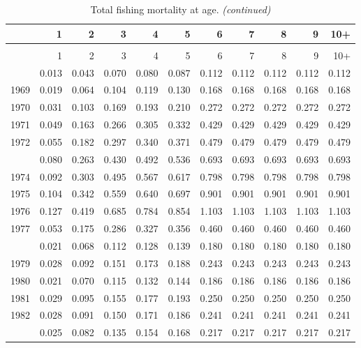 \documentclass[
]{article}
\begin{document}
\begin{longtable}[t]{lrrrrrrrrrr}
\caption{\label{tab:FAA-tot-table}Total fishing mortality at age.}\\
\toprule
  & 1 & 2 & 3 & 4 & 5 & 6 & 7 & 8 & 9 & 10+\\
\midrule
\endfirsthead
\caption[]{Total fishing mortality at age. \textit{(continued)}}\\
\toprule
  & 1 & 2 & 3 & 4 & 5 & 6 & 7 & 8 & 9 & 10+\\
\midrule
\endhead

\endfoot
\bottomrule
\endlastfoot
1968 & 0.013 & 0.043 & 0.070 & 0.080 & 0.087 & 0.112 & 0.112 & 0.112 & 0.112 & 0.112\\
1969 & 0.019 & 0.064 & 0.104 & 0.119 & 0.130 & 0.168 & 0.168 & 0.168 & 0.168 & 0.168\\
1970 & 0.031 & 0.103 & 0.169 & 0.193 & 0.210 & 0.272 & 0.272 & 0.272 & 0.272 & 0.272\\
1971 & 0.049 & 0.163 & 0.266 & 0.305 & 0.332 & 0.429 & 0.429 & 0.429 & 0.429 & 0.429\\
1972 & 0.055 & 0.182 & 0.297 & 0.340 & 0.371 & 0.479 & 0.479 & 0.479 & 0.479 & 0.479\\
\addlinespace
1973 & 0.080 & 0.263 & 0.430 & 0.492 & 0.536 & 0.693 & 0.693 & 0.693 & 0.693 & 0.693\\
1974 & 0.092 & 0.303 & 0.495 & 0.567 & 0.617 & 0.798 & 0.798 & 0.798 & 0.798 & 0.798\\
1975 & 0.104 & 0.342 & 0.559 & 0.640 & 0.697 & 0.901 & 0.901 & 0.901 & 0.901 & 0.901\\
1976 & 0.127 & 0.419 & 0.685 & 0.784 & 0.854 & 1.103 & 1.103 & 1.103 & 1.103 & 1.103\\
1977 & 0.053 & 0.175 & 0.286 & 0.327 & 0.356 & 0.460 & 0.460 & 0.460 & 0.460 & 0.460\\
\addlinespace
1978 & 0.021 & 0.068 & 0.112 & 0.128 & 0.139 & 0.180 & 0.180 & 0.180 & 0.180 & 0.180\\
1979 & 0.028 & 0.092 & 0.151 & 0.173 & 0.188 & 0.243 & 0.243 & 0.243 & 0.243 & 0.243\\
1980 & 0.021 & 0.070 & 0.115 & 0.132 & 0.144 & 0.186 & 0.186 & 0.186 & 0.186 & 0.186\\
1981 & 0.029 & 0.095 & 0.155 & 0.177 & 0.193 & 0.250 & 0.250 & 0.250 & 0.250 & 0.250\\
1982 & 0.028 & 0.091 & 0.150 & 0.171 & 0.186 & 0.241 & 0.241 & 0.241 & 0.241 & 0.241\\
\addlinespace
1983 & 0.025 & 0.082 & 0.135 & 0.154 & 0.168 & 0.217 & 0.217 & 0.217 & 0.217 & 0.217\\

\end{longtable}
\end{document}
